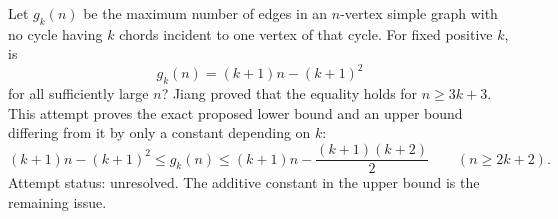 Let \(g_k(n)\) be the maximum number of edges in an \(n\)-vertex simple graph with no cycle having \(k\) chords incident to one vertex of that cycle. For fixed positive \(k\), is
\[
g_k(n)=(k+1)n-(k+1)^2
\]
for all sufficiently large \(n\)?
Jiang proved that the equality holds for \(n\geq3k+3\). This attempt proves the exact proposed lower bound and an upper bound differing from it by only a constant depending on \(k\):
\[
(k+1)n-(k+1)^2\leq g_k(n)
\leq(k+1)n-\frac{(k+1)(k+2)}2 \qquad(n\geq2k+2). \tag{1}
\]
Attempt status: unresolved. The additive constant in the upper bound is the remaining issue.
